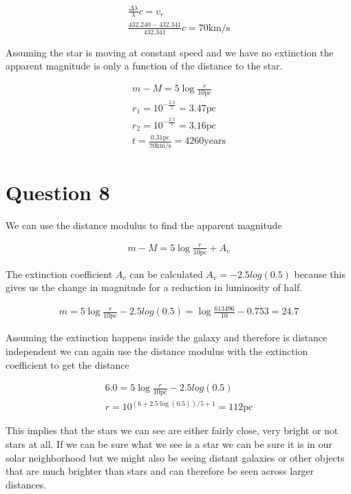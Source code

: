 \documentclass[a4paper]{article}
\begin{document}
\begin{align}
    \frac{\Delta \lambda}{\lambda} c = v_r \\
    \frac{432.240 - 432.341}{432.341} c = 70 \text{km}/\text{s}
\end{align}

Assuming the star is moving at constant speed and we have no extinction the apparent magnitude is only a function of the distance to the star.

\begin{align}
    m-M = 5 \log \frac{r}{10 \text{pc}} \\
    r_1 = 10^{-\frac{2.3}{5}} = 3.47 \text{pc} \\
    r_2 = 10^{-\frac{2.5}{5}} = 3.16 \text{pc} \\
    t = \frac{0.31 \text{pc}}{70 \text{km/s}} = 4 260 \text{years}
\end{align}

\section*{Question 8}

We can use the distance modulus to find the apparent magnitude

\begin{align}
    m - M = 5 \log \frac{r}{10 \text{pc}} + A_v
\end{align}

The extinction coefficient $A_v$ can be calculated $A_v = -2.5log(0.5)$ because this gives us the change in magnitude for a reduction in luminosity of half. 

\begin{align}
    m = 5 \log \frac{r}{10 \text{pc}} - 2.5log(0.5) = \log \frac{613496}{10} - 0.753 = 24.7
\end{align}

Assuming the extinction happens inside the galaxy and therefore is distance independent we can again use the distance modulus with the extinction coefficient to get the distance

\begin{align}
    6.0 = 5 \log \frac{r}{10 \text{pc}} - 2.5log(0.5) \\
    r = 10 ^{(6+2.5\log(0.5))/5 + 1} = 112 \text{pc}
\end{align}

This implies that the stars we can see are either fairly close, very bright or not stars at all. If we can be sure what we see is a star we can be sure it is in our solar neighborhood but we might also be seeing distant galaxies or other objects that are much brighter than stars and can therefore be seen across larger distances. 
\end{document}
